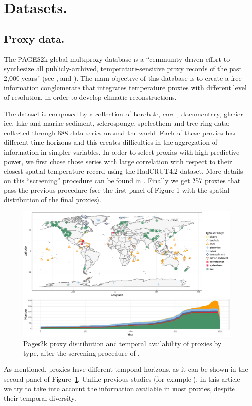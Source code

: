 \documentclass[11pt]{amsart}
\theoremstyle{plain}
\theoremstyle{definition}
\theoremstyle{remark}
\begin{document}
\section{Datasets.}
\label{sec:data}

\subsection{Proxy data.}
The PAGES2k global multiproxy database is a ``community-driven effort to
synthesize all publicly-archived, temperature-sensitive proxy records of the
past 2,000 years'' (see \cite{Kaufman2014}, \cite{PAGES2KConsortium2013} and \cite{PAGES2kConsortium2017}). The main objective of this database is
to create a free information conglomerate that integrates temperature proxies
with different level of resolution, in order to develop climatic
reconstructions.

The dataset is composed by a collection of borehole, coral, documentary, glacier
ice, lake and marine 
sediment, sclerosponge, speleothem and tree-ring data; collected through 688
data series around the world. Each of those proxies
has different time horizons and this creates difficulties in the aggregation of
information in simpler variables.  In order to select proxies with high
predictive power, we first chose those series with large correlation with respect to
their closest spatial temperature record using the HadCRUT4.2 dataset. More
details on this ``screening'' procedure can be found in \cite{Emile-Geay2015}. Finally we get 257 proxies
that pass the previous procedure (see the first panel of Figure \ref{fig:proxy} with the spatial
distribution of the final proxies).   
\begin{figure}
  \centering
  \includegraphics[scale=0.45]{CombinedMap_Area}
  \caption{Pages2k proxy distribution and temporal availability of proxies by
    type, after the screening procedure of \cite{Emile-Geay2015}.}
  \label{fig:proxy}
\end{figure}
As mentioned, proxies have different temporal horizons, as it can be shown in the
second panel of Figure~\ref{fig:proxy}. Unlike previous studies (for example \cite{Barboza2014}), in this article we try to take into account the information available in most proxies, despite their temporal diversity.
\end{document}
